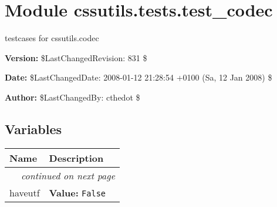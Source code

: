 %
%
%


\section{Module cssutils.tests.test\_codec}

    \label{cssutils:tests:test_codec}
testcases for cssutils.codec

\textbf{Version:} \$LastChangedRevision: 831 \$



\textbf{Date:} \$LastChangedDate: 2008-01-12 21:28:54 +0100 (Sa, 12 Jan 2008) \$



\textbf{Author:} \$LastChangedBy: cthedot \$





  \subsection{Variables}

    \vspace{-1cm}
\hspace{\varindent}\begin{longtable}{|p{\varnamewidth}|p{\vardescrwidth}|l}
\cline{1-2}
\cline{1-2} \centering \textbf{Name} & \centering \textbf{Description}& \\
\cline{1-2}
\endhead\cline{1-2}\multicolumn{3}{r}{\small\textit{continued on next page}}\\\endfoot\cline{1-2}
\endlastfoot\raggedright h\-a\-v\-e\-u\-t\-f\-3\-2\- & \raggedright \textbf{Value:} 
{\tt False}&\\
\cline{1-2}
\end{longtable}



